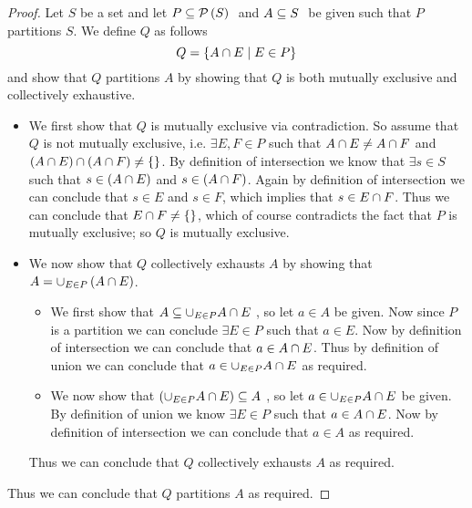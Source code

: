         \begin{proof}
            Let $S$ be a set and let $P \subseteq \mathcal{P}\left(S\right) \ $ and $A \subseteq S \ $ be given such
            that $P$ partitions $S$. We define $Q$ as follows
            \[
                Q = \left\{A \cap E \mid E \in P\right\}
            \]
            and show that $Q$ partitions $A$ by showing that $Q$ is both mutually exclusive
            and collectively exhaustive.
            \begin{itemize}
                \item
                    We first show that $Q$ is mutually exclusive via contradiction.
                    So assume that $Q$ is not mutually exclusive, i.e. $\exists E, F \in P$
                    such that $A \cap E \neq A \cap F$ and 
                    $\left(A \cap E\right) \cap \left(A \cap F\right) \neq \left\{\right\}$.
                    By definition of intersection we know that $\exists s \in S$ such that
                    $s \in \left(A \cap E\right)$ and $s \in \left(A \cap F\right)$. Again by definition 
                    of intersection we can conclude that $s \in E$ and $s \in F$, which implies
                    that $s \in E \cap F$. Thus we can conclude that $E \cap F \neq \left\{\right\}$,
                    which of course contradicts the fact that $P$ is mutually exclusive; so $Q$
                    is mutually exclusive.
                \item
                    We now show that $Q$ collectively exhausts $A$ by showing that
                    $A = \cup_{E \in P} \left(A \cap E\right)$.
                    \begin{itemize}
                        \item
                            We first show that $A \subseteq \cup_{E \in P} A \cap E \ $, so let
                            $a \in A$ be given. Now since $P$ is a partition we can conclude
                            $\exists E \in P$ such that $a \in E$. Now by definition of intersection    
                            we can conclude that $a \in A \cap E$. Thus by definition of
                            union we can conclude that $a \in \cup_{E \in P} A \cap E$ as
                            required.
                        \item
                            We now show that $\left(\cup_{E \in P} A \cap E\right) \subseteq A \ $, so let
                            $a \in \cup_{E \in P} A \cap E$ be given. By definition of union
                            we know $\exists E \in P$ such that $a \in A \cap E$. Now by definition of 
                            intersection we can conclude that $a \in A$ as required.
                    \end{itemize}
                    Thus we can conclude that $Q$ collectively exhausts $A$ as required.
            \end{itemize}
            Thus we can conclude that $Q$ partitions $A$ as required. \QED
        \end{proof}
